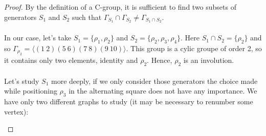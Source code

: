 \begin{proof}
  By the definition of a C-group, it is sufficient to find two subsets of generators $S_1$ and $S_2$ such that $\Gamma_{S_1} \cap \Gamma_{S_2} \neq \Gamma_{S_1 \cap S_2}$.

  \paragraph{}
  In our case, let's take $S_1 = \{\rho_1, \rho_2\}$ and $S_2 = \{\rho_2, \rho_3, \rho_4\}$. Here $S_1 \cap S_2 = \{\rho_2\}$ and so $\Gamma_{\rho_2} = \langle (1\ 2)(5\ 6)(7\ 8)(9\ 10) \rangle$. This group is a cylic groupe of order 2, so it contains only two elements, identity and $\rho_2$. Hence, $\rho_2$ is an involution.

  \paragraph{}
  Let's study $S_1$ more deeply, if we only consider those generators the choice made while positioning $\rho_3$ in the alternating square does not have any importance. We have only two different graphs to study (it may be necessary to renumber some vertex):

  \begin{figure}[H]
    \begin{center}
\end{center}
\end{figure}
\end{proof}
